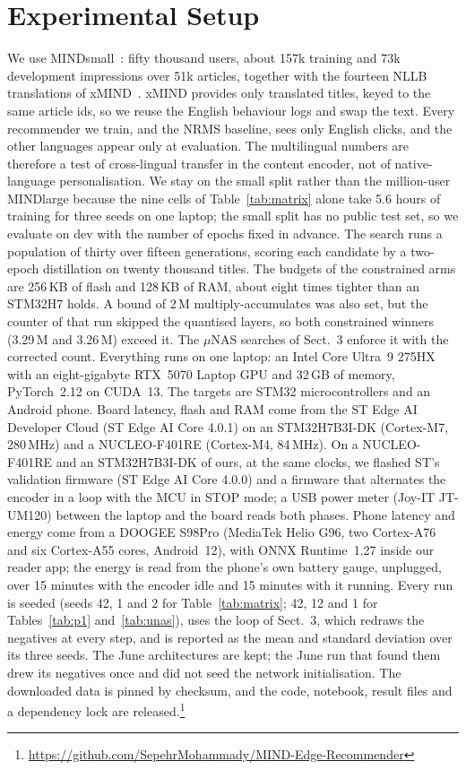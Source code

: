 \documentclass{llncs}
\begin{document}
\section{Experimental Setup}
We use MINDsmall~\cite{wu2020mind}: fifty thousand users, about 157k training and
73k development impressions over 51k articles, together with the fourteen NLLB
translations of xMIND~\cite{iana2024xmind,nllb2022}. xMIND provides only translated
titles, keyed to the same article ids, so we reuse the English behaviour logs and
swap the text. Every recommender we train, and the
NRMS baseline, sees only English clicks, and the other languages appear only at
evaluation. The multilingual numbers are therefore a test of cross-lingual
transfer in the content encoder, not of native-language personalisation. We stay on
the small split rather than the million-user MINDlarge because the nine cells of
Table~\ref{tab:matrix} alone take 5.6 hours of training for three seeds on one
laptop; the small split has no public test set, so
we evaluate on dev with the number of epochs fixed in advance. The search runs a
population of thirty over fifteen generations, scoring each candidate by a
two-epoch distillation on twenty thousand titles. The budgets of the constrained
arms are 256\,KB of flash and 128\,KB of RAM, about eight times tighter than an
STM32H7 holds. A bound of 2\,M multiply-accumulates was also set, but the counter
of that run skipped the quantised layers, so both constrained winners (3.29\,M and
3.26\,M) exceed it. The $\mu$NAS searches of Sect.~3 enforce it with the
corrected count.
Everything runs on one laptop: an Intel Core Ultra~9 275HX with an eight-gigabyte
RTX~5070 Laptop GPU and 32\,GB of memory, PyTorch~2.12 on CUDA~13. The targets
are STM32 microcontrollers and an Android phone. Board latency, flash and RAM
come from the ST Edge AI Developer Cloud (ST Edge AI Core 4.0.1) on an
STM32H7B3I-DK (Cortex-M7, 280\,MHz) and a NUCLEO-F401RE (Cortex-M4, 84\,MHz).
On a NUCLEO-F401RE and an STM32H7B3I-DK of ours, at the same clocks, we flashed
ST's validation firmware (ST Edge AI Core 4.0.0) and a firmware that alternates
the encoder in a loop with the MCU in STOP mode; a USB power meter (Joy-IT
JT-UM120) between the laptop and the board reads both phases. Phone latency and
energy come from a DOOGEE S98Pro (MediaTek Helio G96, two Cortex-A76 and six
Cortex-A55 cores, Android~12), with ONNX Runtime~1.27 inside our reader app; the
energy is read from the phone's own battery gauge, unplugged, over 15 minutes
with the encoder idle and 15 minutes with it running. Every run is seeded (seeds 42, 1 and 2 for
Table~\ref{tab:matrix}; 42, 12 and 1 for Tables~\ref{tab:p1} and~\ref{tab:unas}),
uses the loop of Sect.~3, which redraws the negatives at every step, and is
reported as the mean and standard deviation over its three seeds. The June
architectures are kept; the June run that found them drew its negatives once and
did not seed the network initialisation. The downloaded data is pinned by checksum, and
the code, notebook, result files and a dependency lock are
released.\footnote{\url{https://github.com/SepehrMohammady/MIND-Edge-Recommender}}
\end{document}
